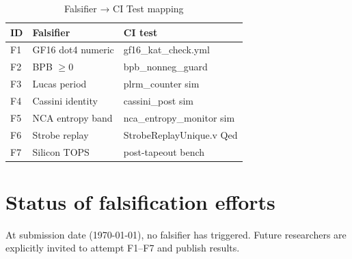 \begin{table}[h]
\centering
\caption{Falsifier → CI Test mapping}
\label{tab:falsifier-map}
\begin{tabular}{lll}
\toprule
ID & Falsifier & CI test \\
\midrule
F1 & GF16 dot4 numeric & gf16_kat_check.yml \\
F2 & BPB \(\geq 0\) & bpb_nonneg_guard \\
F3 & Lucas period & plrm_counter sim \\
F4 & Cassini identity & cassini_post sim \\
F5 & NCA entropy band & nca_entropy_monitor sim \\
F6 & Strobe replay & StrobeReplayUnique.v Qed \\
F7 & Silicon TOPS & post-tapeout bench \\
\bottomrule
\end{tabular}
\end{table}

\section{Status of falsification efforts}
At submission date (\today), no falsifier has triggered. Future
researchers are explicitly invited to attempt F1–F7 and publish results.
